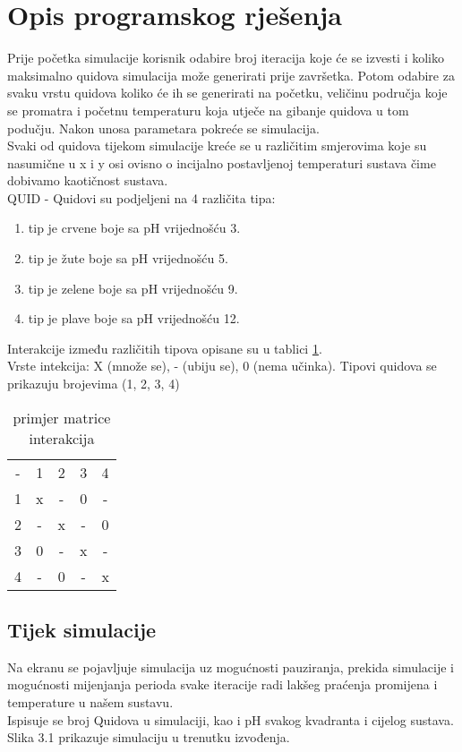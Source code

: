 \documentclass[12pt]{article}
\begin{document}
	\section{Opis programskog rješenja}
	Prije početka simulacije korisnik odabire broj iteracija koje će se izvesti i koliko maksimalno quidova simulacija može generirati prije završetka.
	Potom odabire za svaku vrstu quidova koliko će ih se generirati na početku, veličinu područja koje se promatra i početnu temperaturu koja utječe na gibanje quidova u tom podučju.
	Nakon unosa parametara pokreće se simulacija.\\
	Svaki od quidova tijekom simulacije kreće se 
	u različitim smjerovima koje su nasumične u x i y osi ovisno o incijalno postavljenoj temperaturi sustava čime dobivamo kaotičnost sustava.
\\
	
	QUID
- Quidovi su podjeljeni na 4 različita tipa:
	\begin{enumerate}
		\item tip je crvene boje sa pH vrijednošću 3. 
		\item tip je žute boje sa pH vrijednošću 5.
		\item tip je zelene boje sa pH vrijednošću 9.
		\item tip je plave boje sa pH vrijednošću 12.
	\end{enumerate}
	Interakcije između različitih tipova opisane su u tablici \ref{tab:firstTable}.\\
	Vrste intekcija: X (množe se), - (ubiju se), 0 (nema učinka).
	Tipovi quidova se prikazuju brojevima (1, 2, 3, 4)\\
	\begin{table}[ht]
		\centering
		\begin{tabular}{|ccccc|}
			- & 1 & 2 & 3 & 4 \\
			1 & x & - & 0 & - \\
			2 & - & x & - & 0 \\
			3 & 0 & - & x & - \\
			4 & - & 0 & - & x \\
		\end{tabular}
		\caption{primjer matrice interakcija}
		\label{tab:firstTable}
	\end{table}
	\subsection{Tijek simulacije}
	Na ekranu se pojavljuje simulacija uz mogućnosti pauziranja, prekida simulacije i mogućnosti mijenjanja perioda svake iteracije radi lakšeg praćenja
	promijena i temperature u našem sustavu.\\
	Ispisuje se broj Quidova u simulaciji, kao i pH svakog kvadranta i cijelog sustava. Slika 3.1 prikazuje simulaciju u trenutku izvođenja.\\
	
\end{document}
